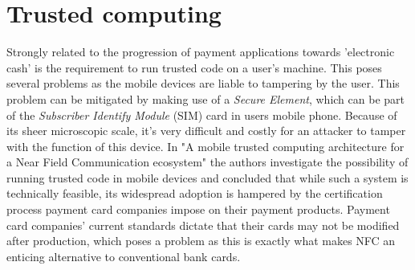 \section{Trusted computing}
Strongly related to the progression of payment applications towards 'electronic cash' is the requirement to run trusted code on a user's machine.
This poses several problems as the mobile devices are liable to tampering by the user.
This problem can be mitigated by making use of a \textit{Secure Element}, which can be part of the \textit{Subscriber Identify Module} (SIM) card in users mobile phone.
Because of its sheer microscopic scale, it's very difficult and costly for an attacker to tamper with the function of this device.
In "A mobile trusted computing architecture for a Near Field Communication ecosystem" the authors investigate the possibility of running trusted code in mobile devices and concluded that while such a system is technically feasible, its widespread adoption is hampered by the certification process payment card companies impose on their payment products.
Payment card companies' current standards dictate that their cards may not be modified after production, which poses a problem as this is exactly what makes NFC an enticing alternative to conventional bank cards.



